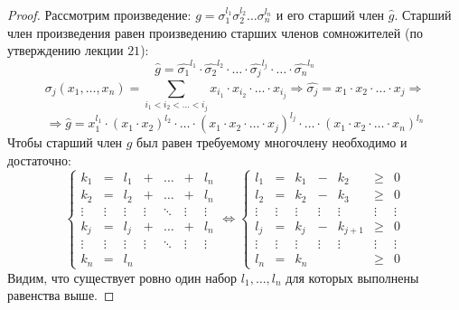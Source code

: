\documentclass[12pt]{article}
\theoremstyle{definition}
\newcommand{\ddsum}[2]{\displaystyle\sum\limits_{#1}^{#2}}
\newcommand{\wht}[1]{\widehat{#1}}
\begin{document}
\begin{proof}
	Рассмотрим произведение: $g =\sigma_1^{l_1}\sigma_2^{l_2}\dotsc \sigma_n^{l_n}$ и его старший член $\wht{g}$. Старший член произведения равен произведению старших членов сомножителей (по утверждению лекции $21$):
	$$
		\wht{g} = \wht{\sigma_1}^{l_1}{\cdot}\wht{\sigma_2}^{l_2}{\cdot}\dotsc{\cdot}\wht{\sigma_j}^{l_j}{\cdot}\dotsc{\cdot}\wht{\sigma_n}^{l_n}
	$$
	$$
		\sigma_j(x_1,\dotsc,x_n) = \ddsum{i_1 < i_2<\dotsc<i_j}{}x_{i_1}{\cdot}x_{i_2}{\cdot}\dotsc{\cdot}x_{i_j} \Rightarrow \wht{\sigma_j} = x_1{\cdot}x_2{\cdot}\dotsc{\cdot}x_j \Rightarrow
	$$
	$$
		\Rightarrow \wht{g} = x_1^{l_1}{\cdot}(x_1{\cdot}x_2)^{l_2}{\cdot}\dotsc{\cdot}(x_1{\cdot}x_2{\cdot}\dotsc{\cdot}x_j)^{l_j}{\cdot}\dotsc{\cdot}(x_1{\cdot}x_2{\cdot}\dotsc{\cdot}x_n)^{l_n}
	$$
	Чтобы старший член $g$ был равен требуемому многочлену необходимо и достаточно:
	$$
		\left\{
		\begin{array}{ccccccc}
			k_1 &=& l_1 &+& \dotsc &+& l_n\\
			k_2 &=& l_2 &+& \dotsc &+& l_n\\
			\vdots &\vdots& \vdots&\vdots& \ddots&\vdots& \vdots\\
			k_j &=& l_j &+& \dotsc &+& l_n\\
			\vdots &\vdots& \vdots&\vdots& \ddots&\vdots& \vdots\\
			k_n &=& l_n & & & &
		\end{array}
		\right. \Leftrightarrow
		\left\{
		\begin{array}{ccccccc}
			l_1 &=& k_1 &-& k_2 & \geq &0\\
			l_2 &=& k_2 &-& k_3 & \geq &0\\
			\vdots &\vdots& \vdots & \vdots & \vdots & \vdots  & \vdots\\
			l_j &=& k_j &-& k_{j+1}& \geq &0\\
			\vdots &\vdots& \vdots & \vdots & \vdots & \vdots  & \vdots\\
			l_n &=& k_n & & & \geq &0
		\end{array}
	\right.
	$$
	Видим, что существует ровно один набор $l_1,\dotsc,l_n$ для которых выполнены равенства выше.
\end{proof}
\end{document}
